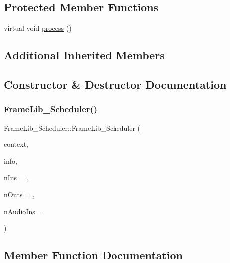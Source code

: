 \subsection*{Protected Member Functions}
\begin{DoxyCompactItemize}
\item 
virtual void \hyperlink{class_frame_lib___scheduler_aa5c10907d7d11e1beef86d19b8e93601}{process} ()
\end{DoxyCompactItemize}
\subsection*{Additional Inherited Members}


\subsection{Constructor \& Destructor Documentation}
\mbox{\label{class_frame_lib___scheduler_a53005f7b96deb4074efcffecf1d39548}} 
\subsubsection{\texorpdfstring{Frame\+Lib\+\_\+\+Scheduler()}{FrameLib\_Scheduler()}}
{\footnotesize\ttfamily Frame\+Lib\+\_\+\+Scheduler\+::\+Frame\+Lib\+\_\+\+Scheduler (\begin{DoxyParamCaption}\item[{\hyperlink{class_frame_lib___context}{Frame\+Lib\+\_\+\+Context}}]{context,  }\item[{\hyperlink{class_frame_lib___parameters_1_1_info}{Frame\+Lib\+\_\+\+Parameters\+::\+Info} $\ast$}]{info,  }\item[{unsigned long}]{n\+Ins = {},  }\item[{unsigned long}]{n\+Outs = {},  }\item[{unsigned long}]{n\+Audio\+Ins = {} }\end{DoxyParamCaption})\hspace{0.3cm}{\ttfamily [inline]}}



\subsection{Member Function Documentation}
\mbox{\label{class_frame_lib___scheduler_a7d93c185e4d7b2d13852dad251dc769b}} 
